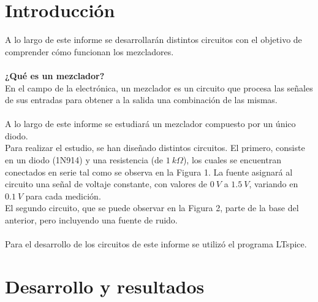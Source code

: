 \section{Introducción}
A lo largo de este informe se desarrollarán distintos circuitos con el objetivo de comprender cómo funcionan los mezcladores.\\
\\
\textbf{¿Qué es un mezclador?}\\
\indent En el campo de la electrónica, un mezclador es un circuito que procesa las señales de sus entradas para obtener a la salida una combinación de las mismas.\\
\\
\indent A lo largo de este informe se estudiará un mezclador compuesto por un único diodo.\\
Para realizar el estudio, se han diseñado distintos circuitos. El primero, consiste en un diodo (1N914) y una resistencia (de $1\ k\Omega$), los cuales se encuentran conectados en serie tal como se observa en la Figura 1. La fuente asignará al circuito una señal de voltaje constante, con valores de $0\ V$ a $1.5\ V$, variando en $0.1\ V$ para cada medición.\\
\indent El segundo circuito, que se puede observar en la Figura 2, parte de la base del anterior, pero incluyendo una fuente de ruido.\\
\\
Para el desarrollo de los circuitos de este informe se utilizó el programa LTspice.
\newpage

\section{Desarrollo y resultados}
